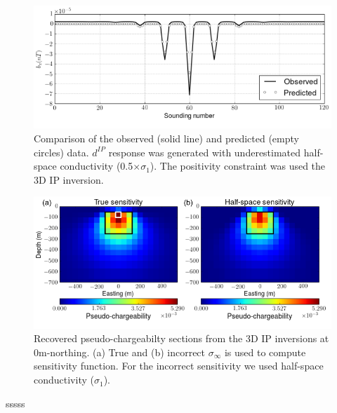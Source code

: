 \documentclass[a4paper, 11pt]{article}
\newcommand{\siginf}{\sigma_\infty}
\newcommand{\dip}{d^{IP}}
\begin{document}
\begin{figure}[htb]
  \centering
  \includegraphics[width=1.\textwidth]{figures/Reg_obspred.png}
  \caption{Comparison of the observed (solid line) and predicted (empty circles) data. $\dip$ response was generated with underestimated half-space conductivity (0.5$\times \sigma_1$). The positivity constraint was used the 3D IP inversion.}
  \label{F:Reg_obspred}
\end{figure}

\begin{figure}[htb]
  \centering
  \includegraphics[width=1.\textwidth]{figures/True_vs_approx_sensitivity.png}
  \caption{Recovered pseudo-chargeabilty sections from the 3D IP inversions at 0m-northing.  (a) True and (b) incorrect $\siginf$ is used to compute sensitivity function. For the incorrect sensitivity we used half-space conductivity ($\sigma_1$).}
  \label{F:True_vs_approx_sensitivity}
\end{figure}
\clearpage
sssss

\end{document}
